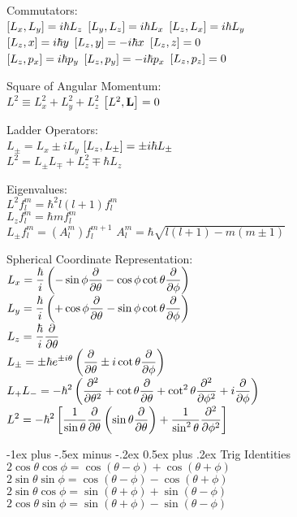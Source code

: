 \documentclass[12pt,landscape]{article}
\makeatletter
\renewcommand{\section}{\@startsection{section}{1}{0mm}%
                                {-1ex plus -.5ex minus -.2ex}%
                                {0.5ex plus .2ex}%
                                {\normalfont\normalsize\bfseries}}
\newcommand{\tab}{\hspace{.02\textwidth}}
\newcommand{\ds}{\displaystyle}
\makeatother
\begin{document}
\begin{multicols}{3}
Commutators:\\
\tab $\comm{L_x}{L_y} = i\hbar L_z$ \quad $\comm{L_y}{L_z} = i\hbar L_x$ \quad $\comm{L_z}{L_x} = i\hbar L_y$\\
\tab $\comm{L_z}{x} = i\hbar y$ \quad $\comm{L_z}{y} = -i\hbar x$ \quad $\comm{L_z}{z} = 0$\\
\tab $\comm{L_z}{p_x} = i\hbar p_y$ \quad $\comm{L_z}{p_y} = -i\hbar p_x$ \quad $\comm{L_z}{p_z} = 0$

Square of Angular Momentum:\\
\tab $L^2 \equiv L_x^2 + L_y^2 + L_z^2$ \qquad $\comm{L^2}{\vb{L}} = 0$

Ladder Operators:\\
\tab $L_\pm = L_x \pm iL_y$ \qquad $\comm{L_z}{L_\pm} = \pm i\hbar L_\pm$\\
\tab $L^2 = L_\pm L_\mp + L_z^2 \mp \hbar L_z$

Eigenvalues:\\
\tab $L^2 f_l^m = \hbar^2 l(l+1)f_l^m$\\
\tab $L_z f_l^m = \hbar m f_l^m$\\
\tab $L_\pm f_l^m = (A_l^m)f_l^{m+1}$ \qquad $A_l^m = \hbar \sqrt{l(l+1) - m(m\pm 1)}$

Spherical Coordinate Representation:\\
\tab $L_x = \ds \frac{\hbar}{i}\left(-\sin\phi \pdv{\theta} - \cos\phi\cot\theta\pdv{\phi}\right)$\\
\tab $L_y = \ds \frac{\hbar}{i}\left(+\cos\phi \pdv{\theta} - \sin\phi\cot\theta\pdv{\phi}\right)$\\
\tab $\ds L_z = \frac{\hbar}{i}\pdv{\theta}$\\
\tab $\ds L_\pm = \pm\hbar e^{\pm i \theta}\left(\pdv{\theta} \pm i\cot\theta\pdv{\phi}\right)$\\
\tab $\ds L_+L_- = -\hbar^2\left(\pdv[2]{\theta}+\cot\theta\pdv{\theta} + \cot^2\theta\pdv[2]{\phi} + i\pdv{\phi}\right)$\\
\tab $\ds L^2 = -\hbar^2\left[\frac{1}{\sin\theta}\pdv{\theta}\left(\sin\theta\pdv{\theta}\right) + \frac{1}{\sin^2\theta}\pdv[2]{\phi}\right]$


\section{Trig Identities}
\tab $2\cos\theta\cos\phi = \cos(\theta - \phi) + \cos(\theta + \phi)$\\
\tab $2\sin\theta\sin\phi = \cos(\theta - \phi) - \cos(\theta + \phi)$\\
\tab $2\sin\theta\cos\phi = \sin(\theta + \phi) + \sin(\theta - \phi)$\\
\tab $2\cos\theta\sin\phi = \sin(\theta + \phi) - \sin(\theta - \phi)$\\


\end{multicols}
\end{document}
